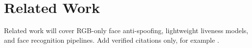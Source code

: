 \section{Related Work}
Related work will cover RGB-only face anti-spoofing, lightweight liveness models, and face recognition pipelines. Add verified citations only, for example \cite{PLACEHOLDER_verify_before_submission}.
